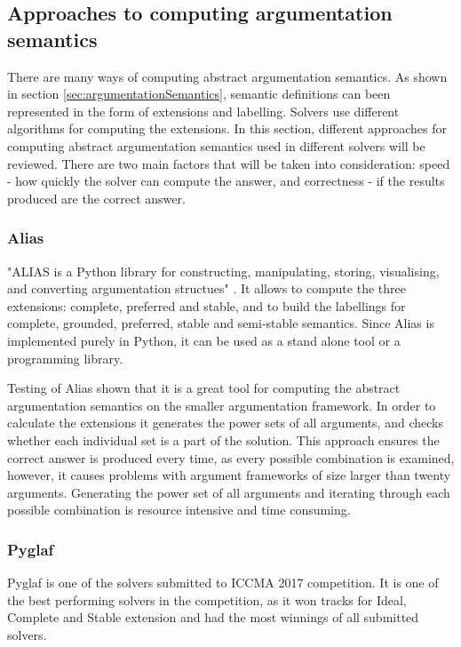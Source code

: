 \subsection{Approaches to computing argumentation semantics}

There are many ways of computing abstract argumentation semantics. As shown in section \ref{sec:argumentationSemantics}, semantic definitions can been represented in the form of extensions and labelling. Solvers use different algorithms for computing the extensions. In this section, different approaches for computing abstract argumentation semantics used in different solvers will be reviewed. There are two main factors that will be taken into consideration: speed - how quickly the solver can compute the answer, and correctness - if the results produced are the correct answer.

\subsubsection{Alias}
"ALIAS is a Python library for constructing, manipulating, storing, visualising, and converting argumentation structues" \citep{alias}. It allows to compute the three extensions: complete, preferred and stable, and to build the labellings for complete, grounded, preferred, stable and semi-stable semantics. Since Alias is implemented purely in Python, it can be used as a stand alone tool or a programming library. 

Testing of Alias shown that it is a great tool for computing the abstract argumentation semantics on the smaller argumentation framework. In order to calculate the extensions it generates the power sets of all arguments, and checks whether each individual set is a part of the solution. This approach ensures the correct answer is produced every time, as every possible combination is examined, however, it causes problems with argument frameworks of size larger than twenty arguments. Generating the power set of all arguments and iterating through each possible combination is resource intensive and time consuming. 


\subsubsection{Pyglaf}
Pyglaf is one of the solvers submitted to ICCMA 2017 competition. It is one of the best performing solvers in the competition, as it won tracks for Ideal, Complete and Stable extension and had the most winnings of all submitted solvers.

